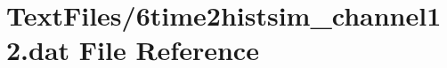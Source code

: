 \hypertarget{6time2histsim__channel12_8dat}{}\section{Text\+Files/6time2histsim\+\_\+channel12.dat File Reference}
\label{6time2histsim__channel12_8dat}
